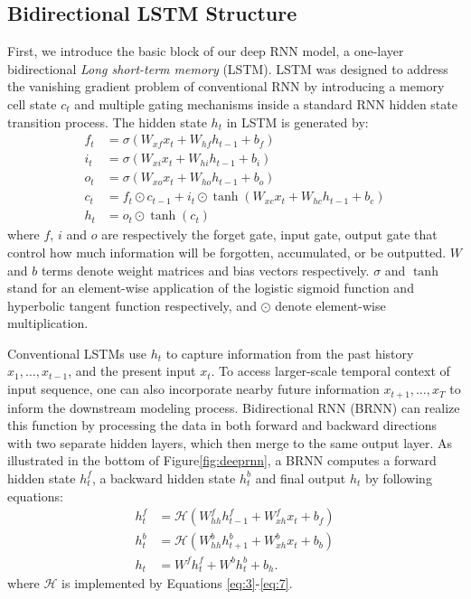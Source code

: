 \documentclass[letterpaper, 10 pt, conference]{ieeeconf}
\begin{document}
\subsection{Bidirectional LSTM Structure}
First, we introduce the basic block of our deep RNN model, a one-layer bidirectional \textit{Long short-term memory }(LSTM).
LSTM \cite{hochreiter1997long} was designed to address the vanishing gradient problem of conventional RNN by introducing a memory cell state $ c_t $ and multiple gating mechanisms inside a standard RNN hidden state transition process.
The hidden state $h_{t}  $ in LSTM is generated by:
\begin{align}
f_{t} & =  \sigma(W_{xf}x_{t} + W_{hf}h_{t-1} + b_{f}) \label{eq:3} \\
i_{t} & =  \sigma(W_{xi}x_{t} + W_{hi}h_{t-1} + b_{i}) \label{eq:4} \\
o_{t} & =  \sigma(W_{xo}x_{t} + W_{ho}h_{t-1} + b_{o}) \label{eq:5} \\
c_{t} & =  f_{t} \odot c_{t-1}+i_{t}\odot \tanh(W_{xc}x_{t}+W_{hc}h_{t-1}+b_{c}) \label{eq:6} \\
h_{t} & =  o_{t} \odot \tanh(c_{t})  \label{eq:7} 
\end{align}
where $ f$, $i$ and  $o$ are respectively the forget gate, input gate, output gate that control how much information will be forgotten, accumulated, or be outputted.
$ W $ and $ b $ terms denote weight matrices and bias vectors respectively.
$\sigma $ and $ \tanh $ stand for an element-wise application of the logistic sigmoid function and hyperbolic tangent function respectively, and {$\odot $} denote element-wise multiplication. 


Conventional LSTMs use $ h_t $ to capture information from the past history $x_{1}, \dots , x_{t-1}  $, and the present input $ x_t $.
To access larger-scale temporal context of input sequence, one can also incorporate nearby future information $ x_{t+1}, \dots , x_{T} $ to inform the downstream modeling process.
Bidirectional RNN (BRNN) \cite{schuster1997bidirectional} can realize this function by processing the data in both forward and backward directions with two separate hidden layers, which then merge to the same output layer. 
As illustrated in the bottom of Figure\ref{fig:deeprnn}, a BRNN computes a forward hidden state $h_t^{f}$, a backward hidden state $h_t^{b} $ and final output $ h_{t} $  by following equations:
\begin{align}
h_{t}^{f} & = \mathcal{H} ( W_{ {h} {h}}^{f}h_{t-1}^{f}+ W_{x h}^{f}x_{t} + b_{f} ) \label{eq:8}\\
h_{t}^{b} & = \mathcal{H} (W_{h h }^{b}h_{t+1}^{b}+ W_{x h}^{b}x_{t} + b_{b})  \label{eq:9} \\
h_{t} & =W^{f}h_{t}^{f} + W^{b}h_{t}^{b} +  b_h \label{eq:10} .
\end{align}
where $ \mathcal{H} $ is implemented by Equations \ref{eq:3}-\ref{eq:7}.
\end{document}
